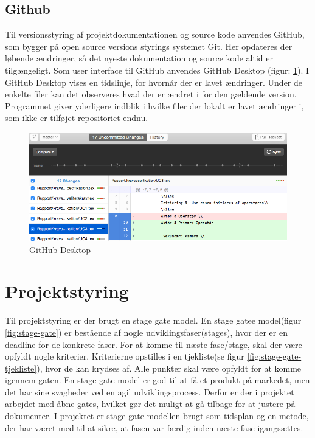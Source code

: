 \subsection{Github}
\label{subsec:github}
Til versionsstyring af projektdokumentationen og source kode anvendes GitHub, som bygger på open source versions styrings systemet Git. Her opdateres der løbende ændringer, så det nyeste dokumentation og source kode altid er tilgængeligt. 
Som user interface til GitHub anvendes GitHub Desktop (figur: \ref{fig:git}). I GitHub Desktop vises en tidslinje, for hvornår der er lavet ændringer. Under de enkelte filer kan det observeres hvad der er ændret i for den gældende version. Programmet giver yderligere indblik i hvilke filer der lokalt er lavet ændringer i, som ikke er tilføjet repositoriet endnu.
\begin{figure}[H]
	\centering
	\includegraphics[width=1\textwidth]{billeder/github.png}
	\caption{GitHub Desktop}
	\label{fig:git}
\end{figure}
\newpage

\section{Projektstyring} 
Til projektstyring er der brugt en stage gate model. En stage gatee model(figur \ref{fig:stage-gate}) er bestående af nogle udviklingsfaser(stages), hvor der er en deadline for de konkrete faser. For at komme til næste fase/stage, skal der være opfyldt nogle kriterier. Kriterierne opstilles i en tjekliste(se figur \ref{fig:stage-gate-tjekliste}), hvor de kan krydses af. Alle punkter skal være opfyldt for at komme igennem gaten. En stage gate model er god til at få et produkt på markedet, men det har sine svagheder ved en agil udviklingsprocess. Derfor er der i projektet arbejdet med åbne gates, hvilket gør det muligt at gå tilbage for at justere på dokumenter. I projektet er stage gate modellen brugt som tidsplan og en metode, der har været med til at sikre, at fasen var færdig inden næste fase igangsættes. 

